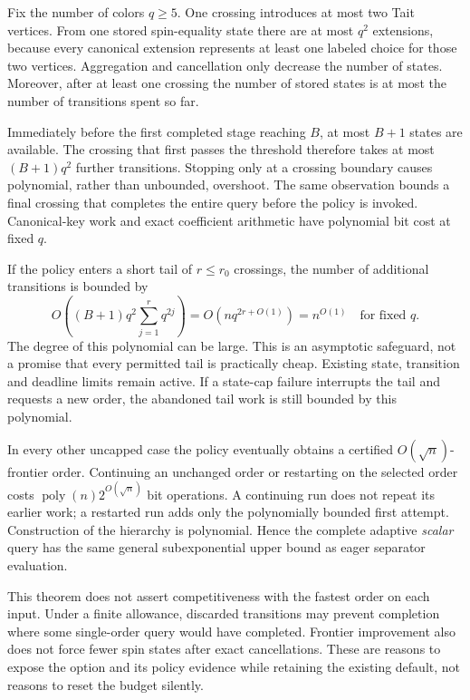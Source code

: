 Fix the number of colors $q\ge5$.  One crossing introduces at most two Tait
vertices.  From one stored spin-equality state there are at most $q^2$
extensions, because every canonical extension represents at least one
labeled choice for those two vertices.  Aggregation and cancellation only
decrease the number of states.  Moreover, after at least one crossing the
number of stored states is at most the number of transitions spent so far.

Immediately before the first completed stage reaching $B$, at most
$B+1$ states are available.  The crossing that first passes the threshold
therefore takes at most $(B+1)q^2$ further transitions.  Stopping only at a
crossing boundary causes polynomial, rather than unbounded, overshoot.
The same observation bounds a final crossing that completes the entire query
before the policy is invoked.  Canonical-key work and exact coefficient
arithmetic have polynomial bit cost at fixed $q$.

If the policy enters a short tail of $r\le r_0$ crossings, the number of
additional transitions is bounded by
\[
 O\!\left((B+1)q^2\sum_{j=1}^{r}q^{2j}\right)
 =O\!\left(nq^{2r+O(1)}\right)
 =n^{O(1)}\quad\text{for fixed }q.
\]
The degree of this polynomial can be large.  This is an asymptotic safeguard,
not a promise that every permitted tail is practically cheap.  Existing
state, transition and deadline limits remain active.  If a state-cap failure
interrupts the tail and requests a new order, the abandoned tail work is
still bounded by this polynomial.

In every other uncapped case the policy eventually obtains a certified
$O(\sqrt n)$-frontier order.  Continuing an unchanged order or restarting
on the selected order costs $\operatorname{poly}(n)2^{O(\sqrt n)}$ bit
operations.  A continuing run does not repeat its earlier work; a restarted
run adds only the polynomially bounded first attempt.  Construction of the
hierarchy is polynomial.  Hence the complete adaptive \emph{scalar} query
has the same general subexponential upper bound as eager separator evaluation.

This theorem does not assert competitiveness with the fastest order on each
input.  Under a finite allowance, discarded transitions may prevent completion
where some single-order query would have completed.  Frontier improvement also
does not force fewer spin states after exact cancellations.  These are reasons
to expose the option and its policy evidence while retaining the existing
default, not reasons to reset the budget silently.

